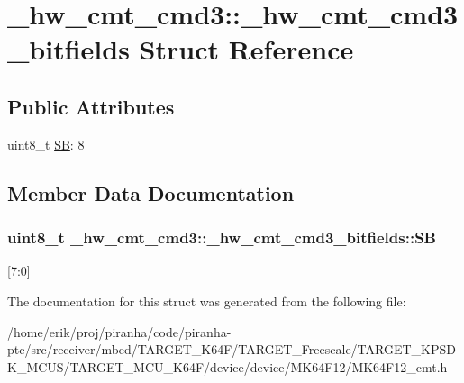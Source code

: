 \hypertarget{struct__hw__cmt__cmd3_1_1__hw__cmt__cmd3__bitfields}{}\section{\+\_\+hw\+\_\+cmt\+\_\+cmd3\+:\+:\+\_\+hw\+\_\+cmt\+\_\+cmd3\+\_\+bitfields Struct Reference}
\label{struct__hw__cmt__cmd3_1_1__hw__cmt__cmd3__bitfields}
\subsection*{Public Attributes}
\begin{DoxyCompactItemize}
\item 
uint8\+\_\+t \hyperlink{struct__hw__cmt__cmd3_1_1__hw__cmt__cmd3__bitfields_a1c453150dcf700bf1545e59881e0031d}{SB}\+: 8
\end{DoxyCompactItemize}


\subsection{Member Data Documentation}
\subsubsection[{\texorpdfstring{SB}{SB}}]{\setlength{\rightskip}{0pt plus 5cm}uint8\+\_\+t \+\_\+hw\+\_\+cmt\+\_\+cmd3\+::\+\_\+hw\+\_\+cmt\+\_\+cmd3\+\_\+bitfields\+::\+SB}\hypertarget{struct__hw__cmt__cmd3_1_1__hw__cmt__cmd3__bitfields_a1c453150dcf700bf1545e59881e0031d}{}\label{struct__hw__cmt__cmd3_1_1__hw__cmt__cmd3__bitfields_a1c453150dcf700bf1545e59881e0031d}
\mbox{[}7\+:0\mbox{]} 

The documentation for this struct was generated from the following file\+:\begin{DoxyCompactItemize}
\item 
/home/erik/proj/piranha/code/piranha-\/ptc/src/receiver/mbed/\+T\+A\+R\+G\+E\+T\+\_\+\+K64\+F/\+T\+A\+R\+G\+E\+T\+\_\+\+Freescale/\+T\+A\+R\+G\+E\+T\+\_\+\+K\+P\+S\+D\+K\+\_\+\+M\+C\+U\+S/\+T\+A\+R\+G\+E\+T\+\_\+\+M\+C\+U\+\_\+\+K64\+F/device/device/\+M\+K64\+F12/M\+K64\+F12\+\_\+cmt.\+h\end{DoxyCompactItemize}
